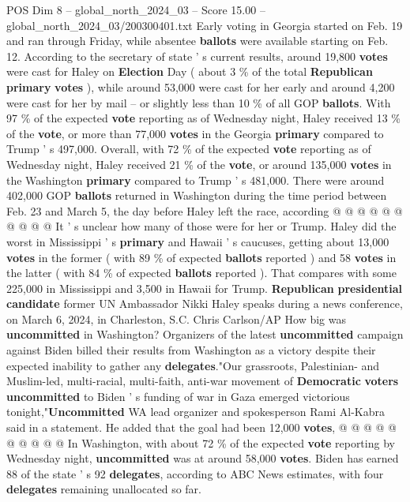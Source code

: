 \begin{textsample}{POS Dim 8 – global\_north\_2024\_03 – Score 15.00 – global\_north\_2024\_03/200300401.txt}
Early voting in Georgia started on Feb. 19 and ran through Friday, while absentee \textbf{ballots} were available starting on Feb. 12.
According to the secretary of state ' s current results, around 19,800 \textbf{votes} were cast for Haley on \textbf{Election} Day ( about 3 \% of the total \textbf{Republican} \textbf{primary} \textbf{votes} ), while around 53,000 were cast for her early and around 4,200 were cast for her by mail -- or slightly less than 10 \% of all GOP \textbf{ballots}.
With 97 \% of the expected \textbf{vote} reporting as of Wednesday night, Haley received 13 \% of the \textbf{vote}, or more than 77,000 \textbf{votes} in the Georgia \textbf{primary} compared to Trump ' s 497,000.
Overall, with 72 \% of the expected \textbf{vote} reporting as of Wednesday night, Haley received 21 \% of the \textbf{vote}, or around 135,000 \textbf{votes} in the Washington \textbf{primary} compared to Trump ' s 481,000.
There were around 402,000 GOP \textbf{ballots} returned in Washington during the time period between Feb. 23 and March 5, the day before Haley left the race, according @ @ @ @ @ @ @ @ @ @ It ' s unclear how many of those were for her or Trump.
Haley did the worst in Mississippi ' s \textbf{primary} and Hawaii ' s caucuses, getting about 13,000 \textbf{votes} in the former ( with 89 \% of expected \textbf{ballots} reported ) and 58 \textbf{votes} in the latter ( with 84 \% of expected \textbf{ballots} reported ).
That compares with some 225,000 in Mississippi and 3,500 in Hawaii for Trump. \textbf{Republican} \textbf{presidential} \textbf{candidate} former UN Ambassador Nikki Haley speaks during a news conference, on March 6, 2024, in Charleston, S.C.
Chris Carlson/AP How big was \textbf{uncommitted} in Washington?
Organizers of the latest \textbf{uncommitted} campaign against Biden billed their results from Washington as a victory despite their expected inability to gather any \textbf{delegates}."Our grassroots, Palestinian- and Muslim-led, multi-racial, multi-faith, anti-war movement of \textbf{Democratic} \textbf{voters} \textbf{uncommitted} to Biden ' s funding of war in Gaza emerged victorious tonight,"\textbf{Uncommitted} WA lead organizer and spokesperson Rami Al-Kabra said in a statement.
He added that the goal had been 12,000 \textbf{votes}, @ @ @ @ @ @ @ @ @ @ In Washington, with about 72 \% of the expected \textbf{vote} reporting by Wednesday night, \textbf{uncommitted} was at around 58,000 \textbf{votes}.
Biden has earned 88 of the state ' s 92 \textbf{delegates}, according to ABC News estimates, with four \textbf{delegates} remaining unallocated so far.

\end{textsample}
